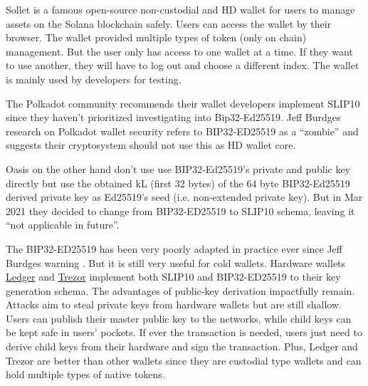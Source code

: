 Sollet \cite{sollet} is a famous open-source non-custodial and HD wallet for users to manage assets on the Solana blockchain safely. Users can access the wallet by their browser. The wallet provided multiple types of token (only on chain) management. But the user only has access to one wallet at a time. If they want to use another, they will have to log out and choose a different index. The wallet is mainly used by developers for testing.

The Polkadot community recommends their wallet developers implement SLIP10 since they haven’t prioritized investigating into Bip32-Ed25519. Jeff Burdges research on Polkadot wallet security refers to BIP32-ED25519 as a “zombie” \cite{Jeff1} and suggests their cryptosystem should not use this as HD wallet core.

Oasis \cite{oasis} on the other hand don't use use BIP32-Ed25519's private and public key directly but use the obtained kL (first 32 bytes) of the 64 byte BIP32-Ed25519 derived private key as Ed25519's seed (i.e. non-extended private key). But in Mar 2021 they decided to change from BIP32-ED25519 to SLIP10 schema, leaving it “not applicable in future”.

The BIP32-ED25519 has been very poorly adapted in practice ever since Jeff Burdges warning \cite{Jeff}. But it is still very useful for cold wallets. Hardware wallets \href{https://www.ledger.com/}{Ledger} and \href{https://trezor.io/}{Trezor} implement both SLIP10 and BIP32-ED25519 to their key generation schema. The advantages of public-key derivation impactfully remain. Attacks aim to steal private keys from hardware wallets but are still shallow. Users can publish their master public key to the networks, while child keys can be kept safe in users' pockets. If ever the transaction is needed, users just need to derive child keys from their hardware and sign the transaction. Plus, Ledger and Trezor are better than other wallets since they are custodial type wallets and can hold multiple types of native tokens.

